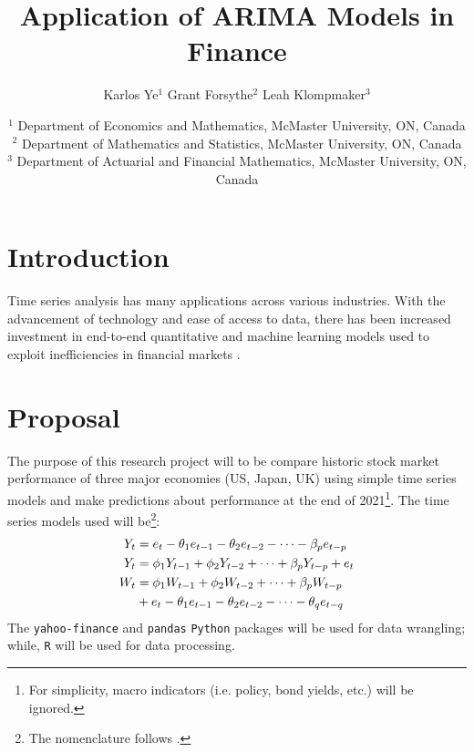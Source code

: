 \documentclass[12pt, centerh1]{article}
\title{Application of ARIMA Models in Finance}
\author{\qquad Karlos Ye$^{1}$ \qquad Grant Forsythe$^{2}$ \qquad Leah Klompmaker$^{3}$}
\date{
{\footnotesize $^1$ Department of Economics and Mathematics, McMaster University, ON, Canada\\[-6pt]
               $^2$ Department of Mathematics and Statistics, McMaster University, ON, Canada\\[-6pt]
               $^3$ Department of Actuarial and Financial Mathematics, McMaster University, ON, Canada\\[-6pt]}
}
\begin{document}
\clearpage\maketitle
\setcounter{page}{1}
\section{Introduction} \label{s:intro}
Time series analysis has many applications across various industries. With the advancement of technology and ease of access to data, there has been increased investment in end-to-end quantitative and machine learning models used to exploit inefficiencies in financial markets \citep{coqueret2021machine}. 
\section{Proposal} \label{s:proposal}
The purpose of this research project will to be compare historic stock market performance of three major economies (US, Japan, UK) using simple time series models and make predictions about performance at the end of 2021\footnote{For simplicity, macro indicators (i.e. policy, bond yields, etc.) will be ignored.}. The time series models used will be\footnote{The nomenclature follows \citet{cryer2008time}.}:
\begin{align} 
\centering
    Y_t &= e_t - \theta_1e_{t-1} - \theta_2e_{t-2} - \cdots - \beta_pe_{t-p}\\
    Y_t &= \phi_1Y_{t-1} + \phi_2Y_{t-2} + \cdots + \beta_pY_{t-p} + e_t\\
    W_t &= \phi_1W_{t-1} + \phi_2W_{t-2} + \cdots + \beta_pW_{t-p}\\
        &+ e_t - \theta_1e_{t-1} - \theta_2e_{t-2} - \cdots - \theta_qe_{t-q}\nonumber
\end{align}
The \texttt{yahoo-finance} and \texttt{pandas} \texttt{Python} packages will be used for data wrangling; while, \texttt{R} will be used for data processing.
\end{document}
